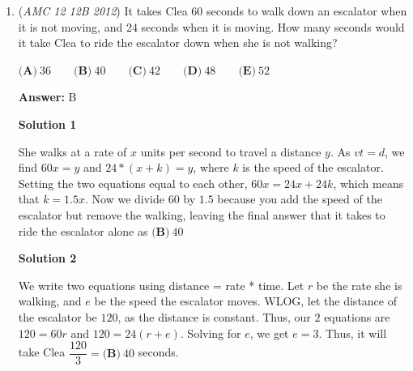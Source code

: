 \begin{enumerate}
 We note that there are $4$ ways to choose the first dessert. Then, each dessert thereafter must be distinct from the prior one. Since there are $4$ options, and $1$ of them has been taken by the prior, each following dessert can be chosen in $(4 - 1) = 3$ ways. Thus, since there are $6$ desserts other than the first, the total number (without restrictions) is $4 \cdot 3^6$

 Thus, by our symmetry argument derived prior, we know that the number of desired meal plans is $\frac{\text{\# plans w/o restrictions}}{4} = \frac{4 \cdot 3^6}{4} = 3^6 = 729$, choice $\boxed{A}$




\textbf{Solution 4 (Answer choices)}

Notice that if we consider Friday cake day, Saturday has $3$ choices. Thus, we consider everything from Sunday to Thursday. Suppose Sunday has $4$ choices, and all the rest of the days have $3$ choices. If we multiply $4 \times 3^5$, we obtain $972$. However, if Wednesday had not been a cake day, there would only be $2$ choices for Thursday. Hence, we know that the answer must be less than $972$. Thus, $729 \Rightarrow \boxed{A}$.

 


	\item (\textit{AMC 12 12B 2012}) It takes Clea 60 seconds to walk down an escalator when it is not moving, and 24 seconds when it is moving. How many seconds would it take Clea to ride the escalator down when she is not walking?


 $\textbf{(A)}\ 36\qquad\textbf{(B)}\ 40\qquad\textbf{(C)}\ 42\qquad\textbf{(D)}\ 48\qquad\textbf{(E)}\ 52$

 \textbf{Answer: }B



\textbf{Solution 1}

She walks at a rate of $x$ units per second to travel a distance $y$. As $vt=d$, we find $60x=y$ and $24*(x+k)=y$, where $k$ is the speed of the escalator. Setting the two equations equal to each other, $60x=24x+24k$, which means that $k=1.5x$. Now we divide $60$ by $1.5$ because you add the speed of the escalator but remove the walking, leaving the final answer that it takes to ride the escalator alone as $\boxed{\textbf{(B)}\ 40}$




\textbf{Solution 2}

We write two equations using distance = rate * time. Let $r$ be the rate she is walking, and $e$ be the speed the escalator moves. WLOG, let the distance of the escalator be $120$, as the distance is constant. Thus, our $2$ equations are $120 = 60r$ and $120 = 24(r+e)$. Solving for $e$, we get $e = 3$. Thus, it will take Clea $\dfrac{120}{3} = \boxed{\textbf{(B)}\ 40}$ seconds.


\end{enumerate}
